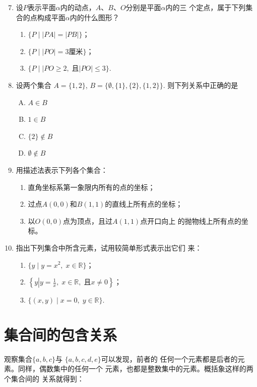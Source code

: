 \begin{enumerate}\setcounter{enumi}{6}
    \item 设$P$表示平面$\alpha$内的动点，$A$、$B
    $、$O$分别是平面$\alpha$内的三
    个定点，属于下列集合的点构成平面$\alpha$内的什么图形？
\begin{enumerate}[(1)]
    \item $\{P\mid  |PA|=|PB|\}$；
\item    $\{P\mid  |PO|=3\text{厘米}\}$；
\item  $\{P\mid  |PO\ge 2,\; \text{且}|PO|\le 3\}$.
\end{enumerate}

    \item 设两个集合
    $A=\{1,2\}$, $B=\{\emptyset, \{1\},\{2\},\{1, 2\}\}$. 则下列关系中正确的是\blank
\begin{multicols}{4}
\begin{enumerate}[(A)]
    \item $A\in B$
    \item $1\in B$
    \item $\{2\}\notin B$
    \item $\emptyset\notin B$
\end{enumerate}
\end{multicols}
   
    \item 用描述法表示下列各个集合：
\begin{enumerate}[(1)]
\item 直角坐标系第一象限内所有的点的坐标；
\item 过点$A(0,0)$和$B(1,1)$的直线上所有点的坐标；
\item 以$O(0,0)$点为顶点，且过$A(1,1)$点开口向上
    的抛物线上所有点的坐标。
\end{enumerate}

\item 指出下列集合中所含元素，试用较简单形式表示出它们
    来：
\begin{enumerate}[(1)]
    \item $\{y\mid y=x^2,\; x\in\mathbb{R}\}$；
    \item $\left\{y\left|y=\frac{1}{x},\; x\in\mathbb{R},\;\text{且}x\ne 0\right.\right\}$；
    \item $\{(x,y)\mid x=0,\; y\in\mathbb{R}\}$.
\end{enumerate}

\end{enumerate}

\section{集合间的包含关系}
观察集合$\{a,b,c\}$与
$\{a,b,c,d,e\}$可以发现，前者的
任何一个元素都是后者的元素。同样，偶数集中的任何一个
元素，也都是整数集中的元素。概括象这样的两个集合间的
关系就得到：

